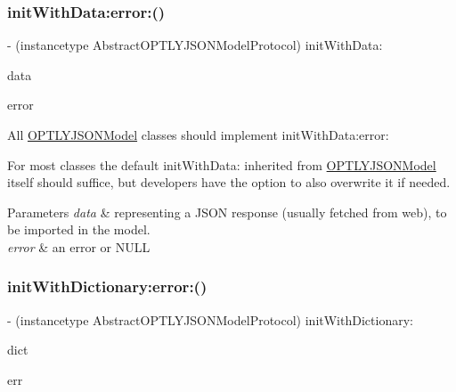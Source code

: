 \subsubsection{\texorpdfstring{init\+With\+Data\+:error\+:()}{initWithData:error:()}}
{\footnotesize\ttfamily -\/ (instancetype Abstract\+O\+P\+T\+L\+Y\+J\+S\+O\+N\+Model\+Protocol) init\+With\+Data\+: \begin{DoxyParamCaption}\item[{(N\+S\+Data $\ast$)}]{data }\item[{error:(N\+S\+Error $\ast$\+\_\+\+\_\+autoreleasing $\ast$)}]{error }\end{DoxyParamCaption}\hspace{0.3cm}{\ttfamily [required]}}

All \mbox{\hyperlink{interface_o_p_t_l_y_j_s_o_n_model}{O\+P\+T\+L\+Y\+J\+S\+O\+N\+Model}} classes should implement init\+With\+Data\+:error\+:

For most classes the default init\+With\+Data\+: inherited from \mbox{\hyperlink{interface_o_p_t_l_y_j_s_o_n_model}{O\+P\+T\+L\+Y\+J\+S\+O\+N\+Model}} itself should suffice, but developers have the option to also overwrite it if needed.


\begin{DoxyParams}{Parameters}
{\em data} & representing a J\+S\+ON response (usually fetched from web), to be imported in the model. \\
\hline
{\em error} & an error or N\+U\+LL \\
\hline
\end{DoxyParams}
\mbox{\label{protocol_abstract_o_p_t_l_y_j_s_o_n_model_protocol_01-p_a04d7259bbbe3915cf45d1c290bc29e69}} 
\subsubsection{\texorpdfstring{init\+With\+Dictionary\+:error\+:()}{initWithDictionary:error:()}}
{\footnotesize\ttfamily -\/ (instancetype Abstract\+O\+P\+T\+L\+Y\+J\+S\+O\+N\+Model\+Protocol) init\+With\+Dictionary\+: \begin{DoxyParamCaption}\item[{(N\+S\+Dictionary $\ast$)}]{dict }\item[{error:(N\+S\+Error $\ast$\+\_\+\+\_\+autoreleasing $\ast$)}]{err }\end{DoxyParamCaption}\hspace{0.3cm}{\ttfamily [required]}}

